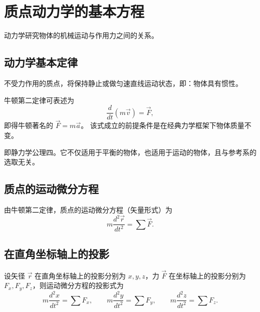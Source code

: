 \section{质点动力学的基本方程}

动力学研究物体的机械运动与作用力之间的关系。

\subsection{动力学基本定律}


不受力作用的质点，将保持静止或做匀速直线运动状态，即：物体具有惯性。


牛顿第二定律可表述为
\begin{equation}\label{eq:10-newton-second}
  \frac{d}{dt}\left(m\vec{v}\right)=\vec{F},
\end{equation}
即得牛顿著名的 $\vec{F}=m\vec{a}$。
该式成立的前提条件是在经典力学框架下物体质量不变。


即静力学公理四。它不仅适用于平衡的物体，也适用于运动的物体，且与参考系的选取无关。

\subsection{质点的运动微分方程}

由牛顿第二定律，质点的运动微分方程（矢量形式）为
\begin{equation}\label{eq:10-motion-ode}
  m\frac{d^2\vec{r}}{dt^2}=\sum\vec{F}.
\end{equation}

\subsection{在直角坐标轴上的投影}

设矢径 $\vec{r}$ 在直角坐标轴上的投影分别为 $x,y,z$，力 $\vec{F}$ 在坐标轴上的投影分别为 $F_x,F_y,F_z$，则运动微分方程的投影式为
\begin{equation}\label{eq:10-projection-xyz}
  m\frac{d^2x}{dt^2}=\sum F_x,\qquad
  m\frac{d^2y}{dt^2}=\sum F_y,\qquad
  m\frac{d^2z}{dt^2}=\sum F_z.
\end{equation}

